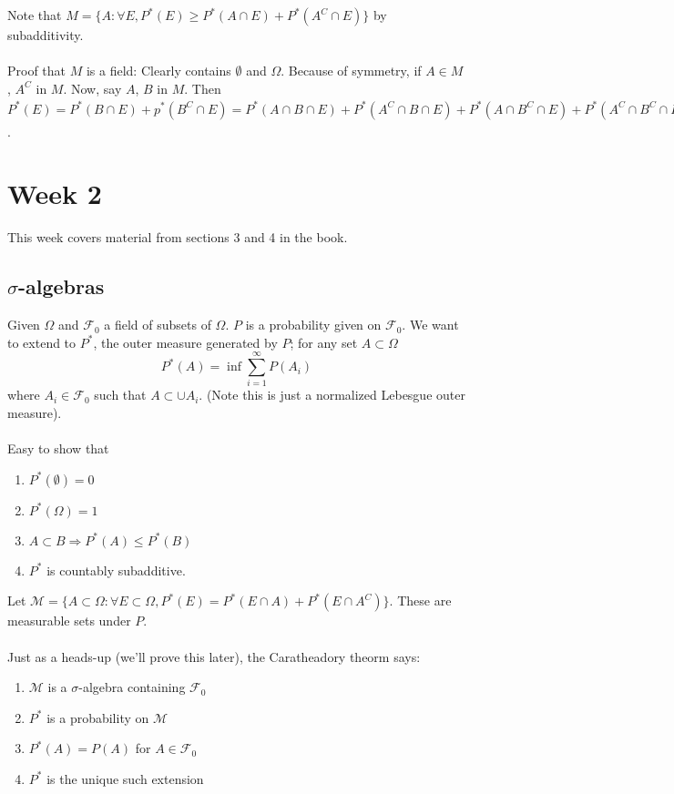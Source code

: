 \documentclass[12pt]{article}
\begin{document}
\\ \\
Note that $M = \{ A : \forall E, P^*(E) \ge P^*(A \cap E) + P^*(A^C \cap E) \}$ by subadditivity.
\\ \\
Proof that $M$ is a field: Clearly contains $\emptyset$ and $\Omega$.  Because of symmetry, if $A \in M$, $A^C$ in $M$.  Now, say $A$, $B$ in $M$.  Then $P^*(E) = P^*(B \cap E) + p^*(B^C \cap E) = P^*(A \cap B \cap E) + P^*(A^C \cap B \cap E) + P^*(A \cap B^C \cap E) + P^*(A^C \cap B^C \cap E) \ge P^*(A \cap B \cap E) + P^*((A^C \cap B \cap E) \cup (A \cap B^C \cap E) \cup (A^C \cap B^C \cap E)) = P^*((A \cap B) \cap E) + P^*((A \cap B)^C \cap E)$.


\section{Week 2}
This week covers material from sections 3 and 4 in the book.

\subsection{$\sigma$-algebras}
Given $\Omega$ and $\mathcal{F}_0$ a field of subsets of $\Omega$.  $P$ is a probability given on $\mathcal{F}_0$.  We want to extend to $P^*$, the outer measure generated by $P$; for any set $A \subset \Omega$
$$P^*(A) = \inf \sum_{i=1}^\infty P(A_i)$$
where $A_i \in \mathcal{F}_0$ such that $A \subset \cup A_i$.  (Note this is just a normalized Lebesgue outer measure).
\\ \\
Easy to show that 
\begin{enumerate}
\item $P^*(\emptyset) = 0$
\item $P^*(\Omega) = 1$
\item $A \subset B \Rightarrow P^*(A) \le P^*(B)$
\item $P^*$ is countably subadditive.
\end{enumerate}

Let $\mathcal{M} = \{ A \subset \Omega : \forall E \subset \Omega, P^*(E) = P^*(E \cap A) + P^*(E \cap A^C) \}$.  These are measurable sets under $P$.
\\ \\
Just as a heads-up (we'll prove this later), the Caratheadory theorm says:
\begin{enumerate}
\item $\mathcal{M}$ is a $\sigma$-algebra containing $\mathcal{F}_0$
\item $P^*$ is a probability on $\mathcal{M}$
\item $P^*(A) = P(A)$ for $A \in \mathcal{F}_0$
\item $P^*$ is the unique such extension
\end{enumerate}
\end{document}
